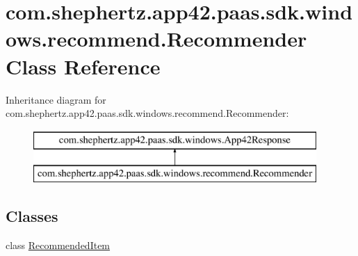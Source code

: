 \hypertarget{classcom_1_1shephertz_1_1app42_1_1paas_1_1sdk_1_1windows_1_1recommend_1_1_recommender}{\section{com.\+shephertz.\+app42.\+paas.\+sdk.\+windows.\+recommend.\+Recommender Class Reference}
\label{classcom_1_1shephertz_1_1app42_1_1paas_1_1sdk_1_1windows_1_1recommend_1_1_recommender}
}
Inheritance diagram for com.\+shephertz.\+app42.\+paas.\+sdk.\+windows.\+recommend.\+Recommender\+:\begin{figure}[H]
\begin{center}
\leavevmode
\includegraphics[height=2.000000cm]{classcom_1_1shephertz_1_1app42_1_1paas_1_1sdk_1_1windows_1_1recommend_1_1_recommender}
\end{center}
\end{figure}
\subsection*{Classes}
\begin{DoxyCompactItemize}
\item 
class \hyperlink{classcom_1_1shephertz_1_1app42_1_1paas_1_1sdk_1_1windows_1_1recommend_1_1_recommender_1_1_recommended_item}{Recommended\+Item}
\end{DoxyCompactItemize}
